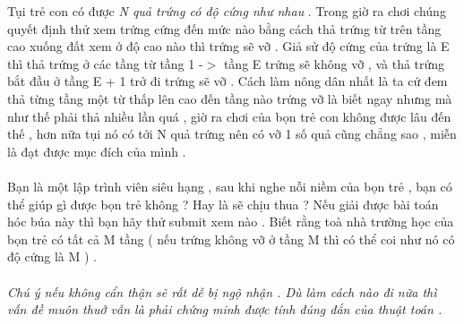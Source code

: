Tụi trẻ con có được   \textit{    N quả trứng có độ cứng như nhau   }   . Trong giờ ra chơi chúng quyết định thử xem trứng cứng đến mức nào bằng cách thả trứng từ trên tầng cao xuống đất xem ở độ cao nào thì trứng sẽ vỡ . Giả sử độ cứng của trứng là E thì thả trứng ở các tầng từ tầng 1 -$>$ tầng E trứng sẽ không vỡ , và thả trứng bắt đầu ở tầng E + 1 trở đi trứng sẽ vỡ . Cách làm nông dân nhất là ta cứ đem thả từng tầng một từ thấp lên cao đến tầng nào trứng vỡ là biết ngay nhưng mà như thế phải thả nhiều lần quá , giờ ra chơi của bọn trẻ con không được lâu đến thế , hơn nữa tụi nó có tới N quả trứng nên có vỡ 1 số quả cũng chẳng sao , miễn là đạt được mục đích của mình .   
\\
\\   Bạn là một lập trình viên siêu hạng , sau khi nghe nỗi niềm của bọn trẻ , bạn có thể giúp gì được bọn trẻ không ? Hay là sẽ chịu thua ? Nếu giải được bài toán hóc búa này thì bạn hãy thử submit xem nào . Biết rằng toà nhà trường học của bọn trẻ có tất cả M tầng  ( nếu trứng không vỡ ở tầng M thì có thể coi như nó có độ cứng là M ) .   
\\
\\\textit{         Chú ý nếu không cẩn thận sẽ rất dễ bị ngộ nhận . Dù làm cách nào đi nữa thì vấn đề muôn thuở vẫn là phải chứng minh được tính đúng đắn của thuật toán .       }